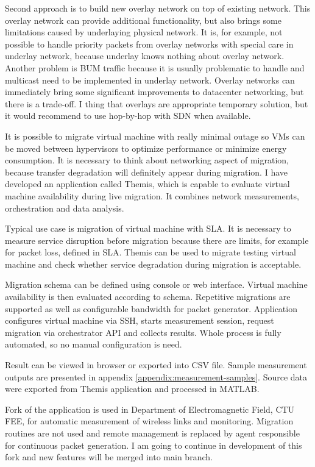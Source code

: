 Second approach is to build new overlay network on top of existing network. This overlay network can provide additional functionality, but also brings some limitations caused by underlaying physical network. It is, for example, not possible to handle priority packets from overlay networks with special care in underlay network, because underlay knows nothing about overlay network. Another problem is \Ac{BUM} traffic because it is usually problematic to handle and multicast need to be implemented in underlay network.
Overlay networks can immediately bring some significant improvements to datacenter networking, but there is a trade-off. I thing that overlays are appropriate temporary solution, but it would recommend to use hop-by-hop with \Ac{SDN} when available.

It is possible to migrate virtual machine with really minimal outage so \Ac{VM}s can be moved between hypervisors to optimize performance or minimize energy consumption. It is necessary to think about networking aspect of migration, because transfer degradation will definitely appear during migration. I have developed an application called Themis, which is capable to evaluate virtual machine availability during live migration. It combines network measurements, orchestration and data analysis.

Typical use case is migration of virtual machine with \Ac{SLA}. It is necessary to measure service disruption before migration because there are limits, for example for packet loss, defined in \Ac{SLA}. Themis can be used to migrate testing virtual machine and check whether service degradation during migration is acceptable.

Migration schema can be defined using console or web interface. Virtual machine availability is then evaluated according to schema. Repetitive migrations are supported as well as configurable bandwidth for packet generator. 
Application configures virtual machine via \Ac{SSH}, starts measurement session, request migration via orchestrator \Ac{API} and collects results. Whole process is fully automated, so no manual configuration is need. 

Result can be viewed in browser or exported into \Ac{CSV} file. Sample measurement outputs are presented in appendix \ref{appendix:measurement-samples}. Source data were exported from Themis application and processed in MATLAB.

Fork of the application is used in Department of Electromagnetic Field, CTU FEE, for automatic measurement of wireless links and monitoring. Migration routines are not used and remote management is replaced by agent responsible for continuous packet generation. I am going to continue in development of this fork and new features will be merged into main branch.

